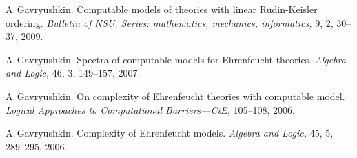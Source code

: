 \documentclass[12pt]{article}
\begin{document}
\begin{itemize}
{\item A.\,Gavryushkin.
	Computable models of theories with linear Rudin-Keisler ordering.
	{\em Bulletin of NSU.
	Series: mathematics, mechanics, informatics,} 9, 2, 30--37, 2009.
\item A.\,Gavryushkin.
	Spectra of computable models for Ehrenfeucht theories.
	{\em Algebra and Logic,} 46, 3, 149--157, 2007.
\item A.\,Gavryushkin.
	On complexity of Ehrenfeucht theories with computable model.
	{\em Logical Approaches to Computational Barriers---CiE,} 105--108, 2006.
\item A.\,Gavryushkin.
	Complexity of Ehrenfeucht models.
	{\em Algebra and Logic,} 45, 5, 289--295, 2006.}
{}
\end{itemize}

\iftoggle{full}{
\centerline{\bf Invited Talks}
}{
\centerline{\bf Recent invited talks}
}
\end{document}

